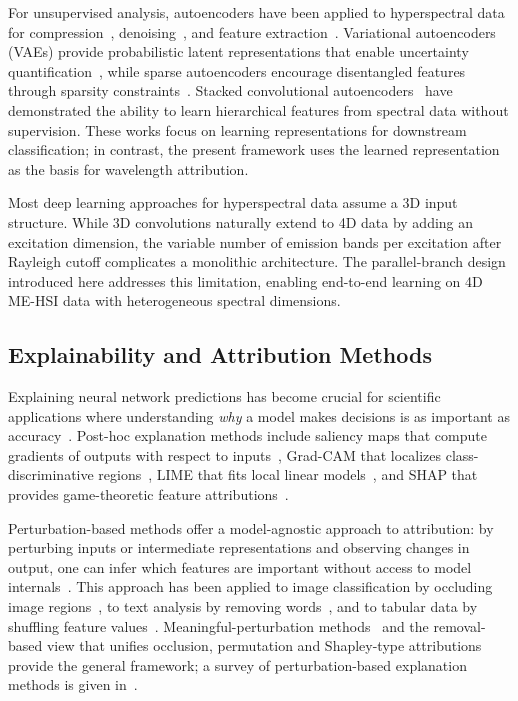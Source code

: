 For unsupervised analysis, autoencoders have been applied to hyperspectral data for compression~\cite{chen2014deep}, denoising~\cite{vincent2008extracting}, and feature extraction~\cite{mou2017unsupervised}.
Variational autoencoders (VAEs) provide probabilistic latent representations that enable uncertainty quantification~\cite{kingma2013auto}, while sparse autoencoders encourage disentangled features through sparsity constraints~\cite{ng2011sparse}.
Stacked convolutional autoencoders~\cite{masci2011stacked} have demonstrated the ability to learn hierarchical features from spectral data without supervision.
These works focus on learning representations for downstream classification; in contrast, the present framework uses the learned representation as the basis for wavelength attribution.

Most deep learning approaches for hyperspectral data assume a 3D input structure.
While 3D convolutions naturally extend to 4D data by adding an excitation dimension, the variable number of emission bands per excitation after Rayleigh cutoff complicates a monolithic architecture.
The parallel-branch design introduced here addresses this limitation, enabling end-to-end learning on 4D ME-HSI data with heterogeneous spectral dimensions.

\subsection{Explainability and Attribution Methods}
\label{sec:related_explain}

Explaining neural network predictions has become crucial for scientific applications where understanding \emph{why} a model makes decisions is as important as accuracy~\cite{gilpin2018explaining}.
Post-hoc explanation methods include saliency maps that compute gradients of outputs with respect to inputs~\cite{simonyan2014deep}, Grad-CAM that localizes class-discriminative regions~\cite{selvaraju2017grad}, LIME that fits local linear models~\cite{ribeiro2016should}, and SHAP that provides game-theoretic feature attributions~\cite{lundberg2017unified}.

Perturbation-based methods offer a model-agnostic approach to attribution: by perturbing inputs or intermediate representations and observing changes in output, one can infer which features are important without access to model internals~\cite{zeiler2014visualizing}.
This approach has been applied to image classification by occluding image regions~\cite{zeiler2014visualizing}, to text analysis by removing words~\cite{li2016understanding}, and to tabular data by shuffling feature values~\cite{fisher2019all}.
Meaningful-perturbation methods~\cite{fong2017perturbation} and the removal-based view that unifies occlusion, permutation and Shapley-type attributions~\cite{covert2021removing} provide the general framework; a survey of perturbation-based explanation methods is given in~\cite{ivanovs2021perturbation}.

